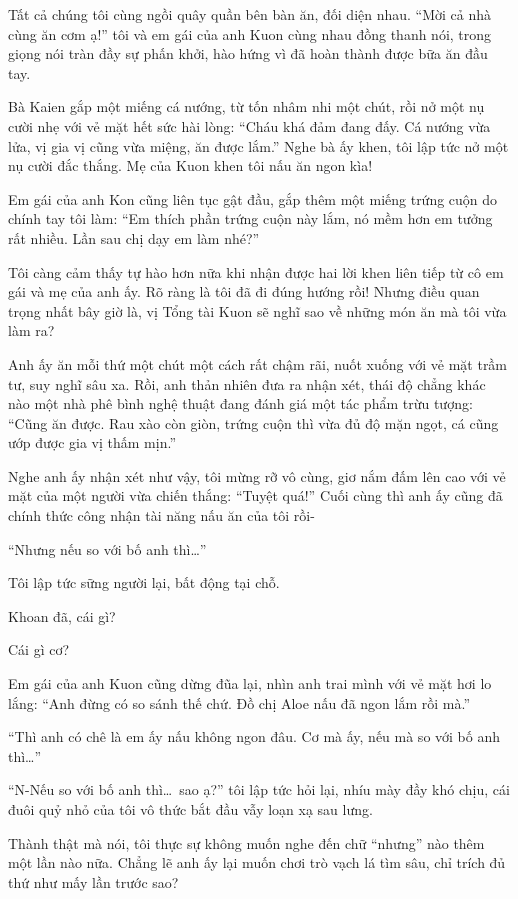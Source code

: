\documentclass[../main.tex]{subfiles}
\begin{document}
\ct

Tất cả chúng tôi cùng ngồi quây quần bên bàn ăn, đối diện nhau. ``Mời cả nhà cùng ăn cơm ạ!'' tôi và em gái của anh Kuon cùng nhau đồng thanh nói, trong giọng nói tràn đầy sự phấn khởi, hào hứng vì đã hoàn thành được bữa ăn đầu tay.

Bà Kaien gắp một miếng cá nướng, từ tốn nhâm nhi một chút, rồi nở một nụ cười nhẹ với vẻ mặt hết sức hài lòng: ``Cháu khá đảm đang đấy. Cá nướng vừa lửa, vị gia vị cũng vừa miệng, ăn được lắm.'' Nghe bà ấy khen, tôi lập tức nở một nụ cười đắc thắng. Mẹ của Kuon khen tôi nấu ăn ngon kìa!

Em gái của anh Kon cũng liên tục gật đầu, gắp thêm một miếng trứng cuộn do chính tay tôi làm: ``Em thích phần trứng cuộn này lắm, nó mềm hơn em tưởng rất nhiều. Lần sau chị dạy em làm nhé?''

Tôi càng cảm thấy tự hào hơn nữa khi nhận được hai lời khen liên tiếp từ cô em gái và mẹ của anh ấy. Rõ ràng là tôi đã đi đúng hướng rồi! Nhưng điều quan trọng nhất bây giờ là, vị Tổng tài Kuon sẽ nghĩ sao về những món ăn mà tôi vừa làm ra?

Anh ấy ăn mỗi thứ một chút một cách rất chậm rãi, nuốt xuống với vẻ mặt trầm tư, suy nghĩ sâu xa. Rồi, anh thản nhiên đưa ra nhận xét, thái độ chẳng khác nào một nhà phê bình nghệ thuật đang đánh giá một tác phẩm trừu tượng: ``Cũng ăn được. Rau xào còn giòn, trứng cuộn thì vừa đủ độ mặn ngọt, cá cũng ướp được gia vị thấm mịn.''

Nghe anh ấy nhận xét như vậy, tôi mừng rỡ vô cùng, giơ nắm đấm lên cao với vẻ mặt của một người vừa chiến thắng: ``Tuyệt quá!'' Cuối cùng thì anh ấy cũng đã chính thức công nhận tài năng nấu ăn của tôi rồi-

``Nhưng nếu so với bố anh thì\dots''

Tôi lập tức sững người lại, bất động tại chỗ.

Khoan đã, cái gì?

Cái gì cơ?

Em gái của anh Kuon cũng dừng đũa lại, nhìn anh trai mình với vẻ mặt hơi lo lắng: ``Anh đừng có so sánh thế chứ. Đồ chị Aloe nấu đã ngon lắm rồi mà.''

``Thì anh có chê là em ấy nấu không ngon đâu. Cơ mà ấy, nếu mà so với bố anh thì\dots''

``N-Nếu so với bố anh thì\dots\ sao ạ?'' tôi lập tức hỏi lại, nhíu mày đầy khó chịu, cái đuôi quỷ nhỏ của tôi vô thức bắt đầu vẫy loạn xạ sau lưng.

Thành thật mà nói, tôi thực sự không muốn nghe đến chữ ``nhưng'' nào thêm một lần nào nữa. Chẳng lẽ anh ấy lại muốn chơi trò vạch lá tìm sâu, chỉ trích đủ thứ như mấy lần trước sao?
\end{document}
